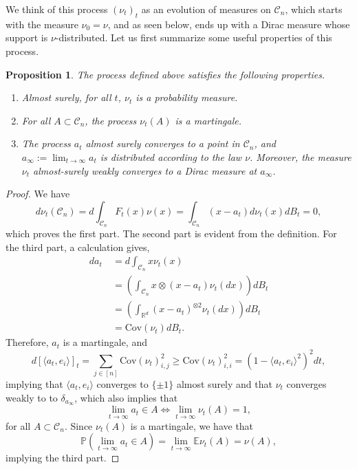 \documentclass[12pt]{article}
\def \RR {\mathbb R}
\def \EE {\mathbb E}
\def \PP {\mathbb P}
\def \DC {\mathcal{C}_n}
\def \COV {\mathrm{Cov}}
\newtheorem{proposition}[theorem]{Proposition}
\theoremstyle{definition}
\theoremstyle{remark}
\begin{document}
We think of this process $(\nu_t)_t$ as an evolution of measures on $\DC$, which starts with the measure $\nu_0 = \nu$, and as seen below, ends up with a Dirac measure whose support is $\nu$-distributed. Let us first summarize some useful properties of this process.
\begin{proposition} \label{prop:basicprops}
The process defined above satisfies the following properties.
\begin{enumerate}
\item 
Almost surely, for all $t$, $\nu_t$ is a probability measure.
\item
For all $A \subset \DC$, the process $\nu_t(A)$ is a martingale.
\item 
The process $a_t$ almost surely converges to a point in $\DC$, and $a_\infty := \lim_{t \to \infty} a_t$ is distributed according to the law $\nu$. Moreover, the measure $\nu_t$ almost-surely weakly converges to a Dirac measure at $a_\infty$.
\end{enumerate}
\end{proposition}
\begin{proof}
We have
$$
d \nu_t(\DC) = d \int_{\DC} F_t(x) \nu(x) = \int_{\DC} (x - a_t) d \nu_t(x) d B_t = 0,
$$
which proves the first part. The second part is evident from the definition. For the third part, a calculation gives,
\begin{align}
da_t ~& = d \int_{\DC} x \nu_t(x)  \nonumber \\
& = \left (\int_{\DC} x \otimes (x - a_t)\nu_t(dx) \right ) dB_t \nonumber \\
& = \left (\int_{\RR^d} (x - a_t)^{\otimes 2} \nu_t(dx) \right ) dB_t \nonumber \\ 
& = \COV(\nu_t) dB_t. \label{eq:dat}
\end{align}
Therefore, $a_t$ is a martingale, and 
\begin{equation}\label{eq:atfast}
d [\langle a_t, e_i \rangle]_t = \sum_{j \in [n]} \COV(\nu_t)_{i,j}^2 \geq \COV(\nu_t)_{i,i}^2 = (1 - \langle a_t, e_i \rangle^2)^2 dt,
\end{equation}
implying that $\langle a_t, e_i \rangle$ converges to $\{\pm 1\}$ almost surely and that $\nu_t$ converges weakly to to $\delta_{a_\infty}$, which also implies that
$$
\lim_{t \to \infty} a_t \in A \Leftrightarrow \lim_{t \to \infty} \nu_t(A) = 1,
$$
for all $A \subset \DC$. Since $\nu_t(A)$ is a martingale, we have that 
$$
\PP \left ( \lim_{t \to \infty} a_t \in A \right ) = \lim_{t \to \infty} \EE \nu_t(A) = \nu(A),
$$
implying the third part.
\end{proof}
\end{document}
